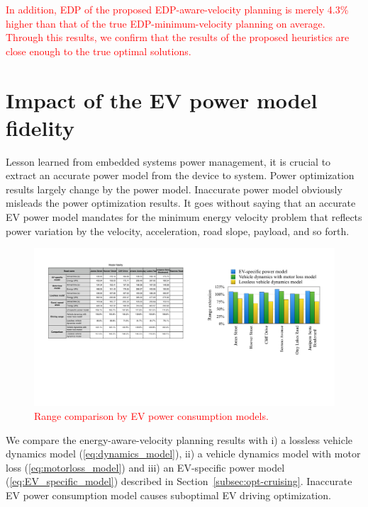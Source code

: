 \documentclass{IEEEtran}
\begin{document}
\textcolor{red}{In addition, EDP of the proposed EDP-aware-velocity planning is merely 4.3\% higher than that of the true EDP-minimum-velocity planning on average. Through this results, we confirm that the results of the proposed heuristics are close enough to the true optimal solutions.}\\


\section{Impact of the EV power model fidelity} \label{sec:impact_EV_power model}

Lesson learned from embedded systems power management, it is crucial to extract an accurate power model from the device to system. Power optimization results largely change by the power model. Inaccurate power model obviously misleads the power optimization results. It goes without saying that an accurate EV power model mandates for the minimum energy velocity problem that reflects power variation by the velocity, acceleration, road slope, payload, and so forth.

\begin{figure}	 %
\centering
\includegraphics[width=0.85\hsize]{Figures/model_fidelity.pdf}
\caption{\textcolor{red}{Range comparison by EV power consumption models.}}
\label{fig:energy_by_model}
\end{figure} 

We compare the energy-aware-velocity planning results with i) a lossless vehicle dynamics model (\ref{eq:dynamics_model}), ii) a vehicle dynamics model with motor loss (\ref{eq:motorloss_model}) and iii) an EV-specific power model (\ref{eq:EV_specific_model}) described in Section~\ref{subsec:opt-cruising}. Inaccurate EV power consumption model causes suboptimal EV driving optimization.
\end{document}
